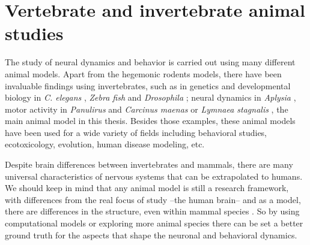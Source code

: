 
\section{Vertebrate and invertebrate animal studies}
\label{c-intro-invertebrates}
The study of neural dynamics and behavior is carried out using many different animal models. Apart from the hegemonic rodents models, there have been invaluable findings using invertebrates, such as in genetics and developmental biology in \textit{C. elegans} \parencite{brenner_genetics_1974}, \textit{Zebra fish} \parencite{streisinger_production_1981} and \textit{Drosophila} \parencite{nusslein-volhard_mutations_1980}; neural dynamics in \textit{Aplysia} \parencite{wachtel_direct_1967}, motor activity in \textit{Panulirus} \parencite{SELVERSTON1976} and \textit{Carcinus maenas} \parencite{eisen_mechanisms_1982} or \textit{Lymnaea stagnalis} \parencite{Benjamin1979b}, the main animal model in this thesis. Besides those examples, these animal models have been used for a wide variety of fields including behavioral studies, ecotoxicology, evolution, human disease modeling, etc. \parencite{romanova_animal_2018} 

Despite brain differences between invertebrates and mammals, there are many universal characteristics of nervous systems that can be extrapolated to humans. We should keep in mind that any animal model is still a research framework, with differences from the real focus of study --the human brain-- and as a model, there are differences in the structure, even within mammal species \parencite{preuss_taking_2000}. So by using computational models or exploring more animal species there can be set a better ground truth for the aspects that shape the neuronal and behavioral dynamics. 


